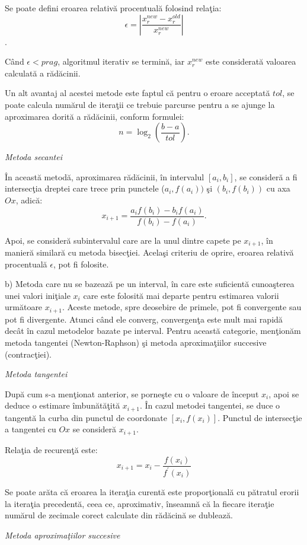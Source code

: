 \documentclass{exam}
\begin{document}
Se poate defini eroarea relativă procentuală folosind relaţia:
$$\epsilon=\left | \frac{x_{r}^{new}-x_{r}^{old}}{x_{r}^{new}} \right |$$.

Când $\epsilon < prag$, algoritmul iterativ se termină, iar $x_{r}^{new}$ este considerată valoarea calculată a rădăcinii.

Un alt avantaj al acestei metode este faptul că pentru o eroare acceptată $tol$, se poate calcula numărul de iteraţii ce trebuie parcurse pentru a se ajunge la aproximarea dorită a rădăcinii, conform formulei:
$$n=\log_{2}(\frac{b-a}{tol}).$$


\textit{Metoda secantei}

În această metodă, aproximarea rădăcinii,  în intervalul $[a_i, b_i]$, se consideră a fi intersecţia  dreptei  care trece prin punctele ($a_i, f(a_i))$ şi $(b_i,f(b_i))$ cu axa $Ox$, adică:
$$x_{i+1}=\frac{a_if(b_i)-b_if(a_i)}{f(b_i)-f(a_i)}.$$

Apoi, se consideră subintervalul care are la unul dintre capete pe $x_{i+1}$, în manieră similară cu metoda bisecţiei. Acelaşi criteriu de oprire, eroarea relativă procentuală $\epsilon$, pot fi folosite.

b) Metoda care nu se bazează pe un interval, în care este suficientă cunoaşterea unei valori iniţiale $x_i$ care este folosită mai departe pentru estimarea valorii următoare $x_{i+1}$. Aceste metode, spre deosebire de primele, pot fi convergente sau pot fi divergente. Atunci când ele converg, convergenţa este mult mai rapidă decât în cazul metodelor bazate pe interval. Pentru această categorie, menţionăm metoda tangentei (Newton-Raphson) şi metoda aproximaţiilor succesive (contracţiei).

\textit{Metoda tangentei}

După cum s-a menţionat anterior, se porneşte cu o valoare de început $x_{i}$, apoi se deduce o estimare îmbunătăţită $x_{i+1}$. În cazul metodei tangentei, se duce o tangentă la curba din punctul de coordonate $[x_{i}, f(x_{i})]$. Punctul de intersecţie a tangentei cu $Ox$ se consideră  $x_{i+1}$.

Relaţia de recurenţă este:
$$x_{i+1}=x_{i}-\frac{f(x_{i})}{f^{'}(x_{i})}$$

Se poate arăta că eroarea la iteraţia curentă este proporţională cu pătratul erorii la iteraţia precedentă, ceea ce, aproximativ, înseamnă că la fiecare iteraţie numărul de zecimale corect calculate din rădăcină se dublează.

\textit{Metoda aproximaţiilor succesive}
\end{document}

